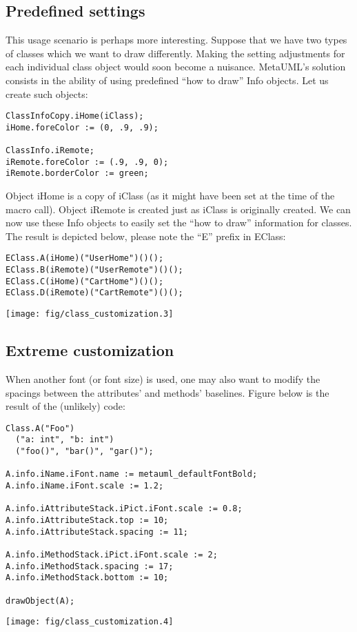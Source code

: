 \documentclass{article}
\newcommand{\code}{\ttfamily}
\newcommand{\metauml}{MetaUML}
\begin{document}
\subsection{Predefined settings}

This usage scenario is perhaps more interesting. Suppose that we have two
types of classes which we want to draw differently. Making the setting adjustments
for each individual class object would soon become a nuisance. \metauml's solution consists in the
ability of using predefined ``how to draw'' {\code Info} objects. Let us create such objects:

\begin{verbatim}
ClassInfoCopy.iHome(iClass);
iHome.foreColor := (0, .9, .9);

ClassInfo.iRemote;
iRemote.foreColor := (.9, .9, 0);
iRemote.borderColor := green;
\end{verbatim}

Object {\code iHome} is a copy of {\code iClass} (as it might have been set at
the time of the macro call). Object {\code iRemote} is created just as {\code iClass}
is originally created. We can now use these {\code Info} objects to easily set the
``how to draw'' information for classes. The result is depicted below,
please note the ``{\code E}'' prefix in {\code EClass}:

\begin{multicols}{2}
\begin{verbatim}
EClass.A(iHome)("UserHome")()();
EClass.B(iRemote)("UserRemote")()();
EClass.C(iHome)("CartHome")()();
EClass.D(iRemote)("CartRemote")()();
\end{verbatim}
\columnbreak
\hspace{1cm}\texttt{[image: fig/class\_customization.3]}
\end{multicols}

\subsection{Extreme customization}

When another font (or font size) is used, one may also want to modify the spacings between the
attributes' and methods' baselines. Figure below is the result of the
(unlikely) code:

\begin{multicols}{2}
\begin{verbatim}
Class.A("Foo")
  ("a: int", "b: int")
  ("foo()", "bar()", "gar()");

A.info.iName.iFont.name := metauml_defaultFontBold;
A.info.iName.iFont.scale := 1.2;

A.info.iAttributeStack.iPict.iFont.scale := 0.8;
A.info.iAttributeStack.top := 10;
A.info.iAttributeStack.spacing := 11;

A.info.iMethodStack.iPict.iFont.scale := 2;
A.info.iMethodStack.spacing := 17;
A.info.iMethodStack.bottom := 10;

drawObject(A);
\end{verbatim}
\columnbreak
\hspace{4cm}\texttt{[image: fig/class\_customization.4]}
\end{multicols}
\end{document}
